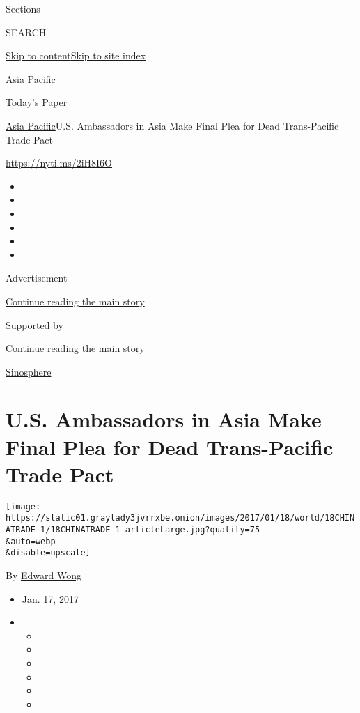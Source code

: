 Sections

SEARCH

\protect\hyperlink{site-content}{Skip to
content}\protect\hyperlink{site-index}{Skip to site index}

\href{https://www.nytimes3xbfgragh.onion/section/world/asia}{Asia
Pacific}

\href{https://myaccount.nytimes3xbfgragh.onion/auth/login?response_type=cookie\&client_id=vi}{}

\href{https://www.nytimes3xbfgragh.onion/section/todayspaper}{Today's
Paper}

\href{/section/world/asia}{Asia Pacific}\textbar{}U.S. Ambassadors in
Asia Make Final Plea for Dead Trans-Pacific Trade Pact

\url{https://nyti.ms/2iH8I6O}

\begin{itemize}
\item
\item
\item
\item
\item
\item
\end{itemize}

Advertisement

\protect\hyperlink{after-top}{Continue reading the main story}

Supported by

\protect\hyperlink{after-sponsor}{Continue reading the main story}

\href{/column/sinosphere}{Sinosphere}

\hypertarget{us-ambassadors-in-asia-make-final-plea-for-dead-trans-pacific-trade-pact}{%
\section{U.S. Ambassadors in Asia Make Final Plea for Dead Trans-Pacific
Trade
Pact}\label{us-ambassadors-in-asia-make-final-plea-for-dead-trans-pacific-trade-pact}}

\texttt{[image: https://static01.graylady3jvrrxbe.onion/images/2017/01/18/world/18CHINATRADE-1/18CHINATRADE-1-articleLarge.jpg?quality=75\\\&auto=webp\\\&disable=upscale]}

By \href{http://www.nytimes3xbfgragh.onion/by/edward-wong}{Edward Wong}

\begin{itemize}
\item
  Jan. 17, 2017
\item
  \begin{itemize}
  \item
  \item
  \item
  \item
  \item
  \item
  \end{itemize}
\end{itemize}

